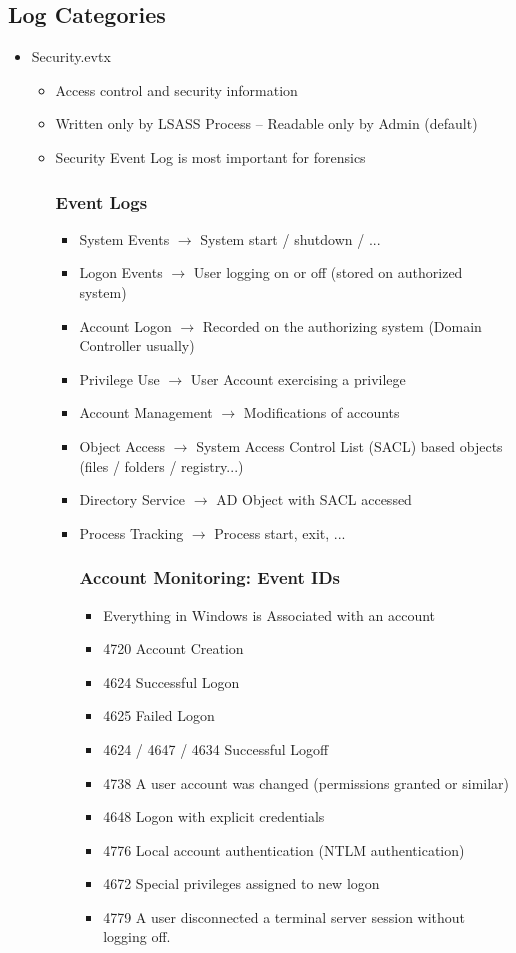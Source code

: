 \subsection{Log Categories}
\begin{itemize}
  \item Security.evtx
  \begin{itemize}
    \tightlist
    \item Access control and security information
    \item Written only by LSASS Process – Readable only by Admin (default)
    \item Security Event Log is most important for forensics
    \subsubsection*{Event Logs}
    \begin{itemize}
      \item System Events $\rightarrow$ System start / shutdown / ...
      \item Logon Events $\rightarrow$ User logging on or off (stored on authorized system)
      \item Account Logon $\rightarrow$ Recorded on the authorizing system (Domain Controller usually)
      \item Privilege Use $\rightarrow$ User Account exercising a privilege
      \item Account Management $\rightarrow$ Modifications of accounts
      \item Object Access $\rightarrow$ System Access Control List (SACL) based objects (files / folders / registry...)
      \item Directory Service $\rightarrow$ AD Object with SACL accessed
      \item Process Tracking $\rightarrow$ Process start, exit, ...
      \subsubsection*{Account Monitoring: Event IDs}
      \begin{itemize}
        \item Everything in Windows is Associated with an account
        \item 4720 Account Creation
        \item 4624 Successful Logon
        \item 4625 Failed Logon
        \item 4624 / 4647 / 4634 Successful Logoff
        \item 4738 A user account was changed (permissions granted or similar)
        \item 4648 Logon with explicit credentials
        \item 4776 Local account authentication (NTLM authentication)
        \item 4672 Special privileges assigned to new logon
        \item 4779 A user disconnected a terminal server session without logging off.
      \end{itemize}


\end{itemize}
\end{itemize}
\end{itemize}
